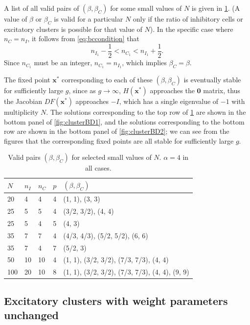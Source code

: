 \documentclass[reqno]{siamonline190516}
\newcommand{\xvec}{\mathbf{x}}
\newcommand{\Zerovec}{\mathbf{0}}
\begin{document}
A list of all valid pairs of $(\beta, \beta_C)$ for some small values of $N$ is given in \cref{table:validbeta}. (A value of $\beta$ or $\beta_C$ is valid for a particular $N$ only if the ratio of inhibitory cells or excitatory clusters is possible for that value of $N$). In the specific case where $n_C = n_I$, it follows from \cref{eq:bccondition} that 
\[
n_{I_1} - \frac{1}{2} < n_{C_1} < n_{I_1} + \frac{1}{2}.
\]
Since $n_{C_1}$ must be an integer, $n_{C_1} = n_{I_1}$, which implies $\beta_C = \beta$.

The fixed point $\xvec^*$ corresponding to each of these $(\beta, \beta_C)$ is eventually stable for sufficiently large $g$, since as $g\rightarrow \infty$, $H(\xvec^*)$ approaches the $\Zerovec$ matrix, thus the Jacobian $DF(\xvec^*)$ approaches $-I$, which has a single eigenvalue of $-1$ with multiplicity $N$. The solutions corresponding to the top row of \cref{table:validbeta} are shown in the bottom panel of \cref{fig:clusterBD1}, and the solutions corresponding to the bottom row are shown in the bottom panel of \cref{fig:clusterBD2}; we can see from the figures that the corresponding fixed points are all stable for sufficiently large $g$.

\begin{table}
\centering
    \begin{tabular}{lllll}
        \toprule
        $N$ & $n_I$ & $n_C$ & $p$ & $(\beta, \beta_C)$ \\
        \midrule
        20 & 4 & 4 & 4 & (1, 1), (3, 3) \\
        25 & 5 & 5 & 4 & (3/2, 3/2), (4, 4) \\
        25 & 5 & 4 & 5 & (4, 3) \\
        35 & 7 & 7 & 4 & (4/3, 4/3), (5/2, 5/2), (6, 6) \\
        35 & 7 & 4 & 7 & (5/2, 3) \\
        50 & 10 & 10 & 4 & (1, 1), (3/2, 3/2), (7/3, 7/3), (4, 4) \\
        100 & 20 & 10 & 8 & (1, 1), (3/2, 3/2), (7/3, 7/3), (4, 4), (9, 9) \\
        \bottomrule
    \end{tabular}
    \vspace{0.25cm}
    \caption{Valid pairs $(\beta, \beta_C)$ for selected small values of $N$. $\alpha = 4$ in all cases.}
    \label{table:validbeta}
\end{table}

\subsection{Excitatory clusters with weight parameters unchanged}
\end{document}
